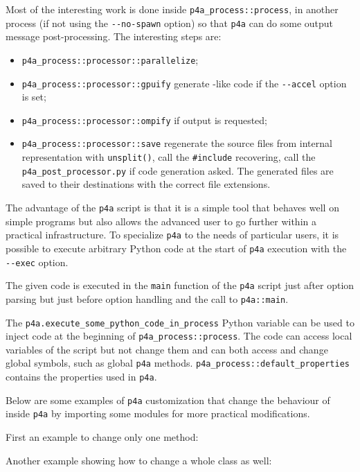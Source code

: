 \documentclass[a4paper]{article}
\begin{document}
Most of the interesting work is done inside \verb|p4a_process::process|,
in another process (if not using the \verb|--no-spawn| option) so that
\texttt{p4a} can do some \Apips output message post-processing. The
interesting steps are:
\begin{itemize}
\item \verb|p4a_process::processor::parallelize|;
\item \verb|p4a_process::processor::gpuify| generate \Agpu-like code if the
  \verb|--accel| option is set;
\item \verb|p4a_process::processor::ompify| if \Aopenmp output
  is requested;
\item \verb|p4a_process::processor::save| regenerate the source files from
  \Apips internal representation with \verb|unsplit()|, call the
  \verb|#include| recovering, call the \verb|p4a_post_processor.py| if
  \Agpu code generation asked. The generated files are saved to
  their destinations with the correct file extensions.
\end{itemize}

The advantage of the \texttt{p4a} script is that it is a simple tool that
behaves well on simple programs but also allows the advanced user to go
further within a practical infrastructure.
To specialize \texttt{p4a} to the needs of particular users, it is
possible to execute
arbitrary Python code at the start of \texttt{p4a} execution with the
\verb|--exec| option.

The given code is executed in the \verb|main| function of the \verb|p4a|
script just after option parsing but just before option handling and the
call to \verb|p4a::main|.

The \verb|p4a.execute_some_python_code_in_process| Python variable can be
used to inject code at the beginning of \verb|p4a_process::process|.
The code can access local variables of the script but not change
them and can both access and change global symbols, such as global
\texttt{p4a} methods.
\verb|p4a_process::default_properties| contains the \Apips properties used
in \texttt{p4a}.

Below are some examples of \texttt{p4a} customization that change the
behaviour of \Apyps inside \texttt{p4a} by importing some modules for more
practical modifications.

First an example to change only one method:


Another example showing how to change a whole class as well:



\end{document}
